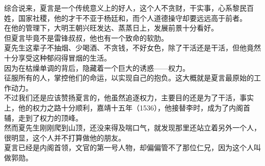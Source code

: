\begin{multicols}{\theparacolNo}
综合说来，夏言是一个传统意义上的好人，这个人不贪财，干实事，心系黎民百姓，国家社稷，他的才干不亚于杨廷和，而个人道德操守却要远远高于前者。\\

在他的管理下，大明王朝兴旺发达、蒸蒸日上，发展前景十分看好。\\

但夏言毕竟不是雷锋叔叔，他也有一个致命的软肋。\\

夏先生这辈子不抽烟、少喝酒、不贪钱，不好女色，除了干活还是干活，但他竟然十分享受这种郁闷得冒烟的生活。\\

因为在枯燥单调的背后，隐藏着一个巨大的诱惑——权力。\\

征服所有的人，掌控他们的命运，以实现自己的抱负。这大概就是夏言最原始的工作动力。\\

不过我们还是应该赞扬夏言的，他虽然追逐权力，主要目的还是为了干活，事实上，他的权力之路十分顺利，嘉靖十五年（1536），他接替李时，成为了内阁首辅，走到了权力的顶峰。\\

然而夏先生刚刚爬到山顶，还没来得及喘口气，就发现那里还站立着另外一个人，很明显，这个人并不打算做他的朋友。\\

夏言已经是内阁首领，文官的第一号人物，却偏偏管不了那位仁兄，因为这个人叫做郭勋。\\
\ifnum{}
	\end{multicols}
\fi
\newpage
